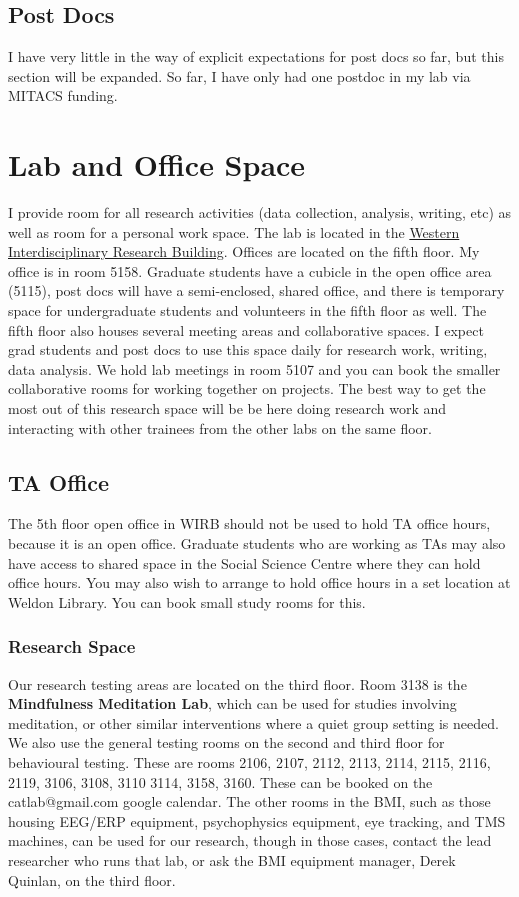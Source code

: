 \documentclass{article}
\begin{document}
\subsection {Post Docs}
I have very little in the way of explicit expectations for post docs so far, but this section will be expanded. So far, I have only had one postdoc in my lab via MITACS funding. 


\section {Lab and Office Space}
I provide room for all research activities (data collection, analysis, writing, etc) as well as room for a personal work space. The lab is located in the \href{http://www.uwo.ca/bmi/about/wirb.html}{Western Interdisciplinary Research Building}. Offices are located on the fifth floor. My office is in room 5158. Graduate students have a cubicle in the open office area (5115), post docs will have a semi-enclosed, shared office, and there is temporary space for undergraduate students and volunteers in the fifth floor as well. The fifth floor also houses several meeting areas and collaborative spaces. I expect grad students and post docs to use this space daily for research work, writing, data analysis. We hold lab meetings in room 5107 and you can book the smaller collaborative rooms for working together on projects. The best way to get the most out of this research space will be be here doing research work and interacting with other trainees from the other labs on the same floor. 

\subsection{TA Office}
The 5th floor open office in WIRB should not be used to hold TA office hours, because it is an open office. Graduate students who are working as TAs may also have access to shared space in the Social Science Centre where they can hold office hours. You may also wish to arrange to hold office hours in a set location at Weldon Library. You can book small study rooms for this. 

\subsubsection{Research Space} Our research testing areas are located on the third floor. Room 3138 is the \textbf{Mindfulness Meditation Lab}, which can be used for studies involving meditation, or other similar interventions where a quiet group setting is needed. We also use the general testing rooms on the second and third floor for behavioural testing. These are rooms 2106, 2107, 2112, 2113, 2114, 2115, 2116, 2119, 3106, 3108, 3110 3114, 3158, 3160. These can be booked on the catlab@gmail.com google calendar. The other rooms in the BMI, such as those housing EEG/ERP equipment, psychophysics equipment, eye tracking, and TMS machines, can be used for our research, though in those cases, contact the lead researcher who runs that lab, or ask the BMI equipment manager, Derek Quinlan, on the third floor. 
\end{document}
